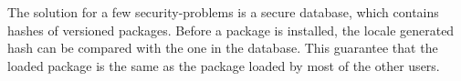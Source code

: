 




The solution for a few security-problems is a secure database, which contains hashes of versioned packages. Before a package is installed, the locale generated hash can be compared with the one in the database. This guarantee that the loaded package is the same as the package loaded by most of the other users.

